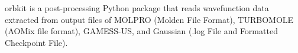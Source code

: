 orbkit is a post-processing Python package that reads wavefunction data extracted from output files of MOLPRO (Molden File Format), TURBOMOLE (AOMix file format), GAMESS-US, and Gaussian (.log File and Formatted Checkpoint File).